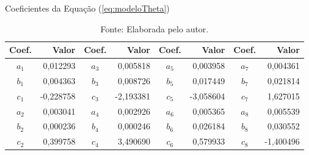 
\begin{table}[H]
	\centering
	\caption{Coeficientes da Equação (\ref{eq:modeloTheta})}
	\begin{tabular}{crcrcrcr}
		\toprule
		\textbf{Coef.} & \textbf{Valor} & \textbf{Coef.} & \textbf{Valor} & \textbf{Coef.} & \textbf{Valor} & \textbf{Coef.} & \textbf{Valor}\\
		\hline
        $a_1$   & 0,012293 & $a_3$   & 0,005818 & $a_5$   & 0,003958 & $a_7$   & 0,004361  \\
        $b_1$   & 0,004363 & $b_3$   & 0,008726 & $b_5$   & 0,017449 & $b_7$   & 0,021814  \\
        $c_1$   &-0,228758 & $c_3$   &-2,193381 & $c_5$   &-3,058604 & $c_7$   & 1,627015  \\
        $a_2$   & 0,003041 & $a_4$   & 0,002926 & $a_6$   & 0,005365 & $a_8$   & 0,005539  \\
        $b_2$   & 0,000236 & $b_4$   & 0,000246 & $b_6$   & 0,026184 & $b_8$   & 0,030552  \\
        $c_2$   & 0,399758 & $c_4$   & 3,490690 & $c_6$   & 0,579933 & $c_8$   &-1,400496  \\
		\bottomrule
	\end{tabular}
	\caption*{\footnotesize Fonte: Elaborada pelo autor.}
	\label{tab:coeficientes}
\end{table}


